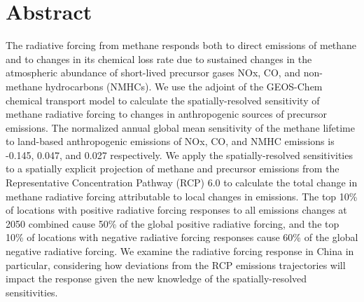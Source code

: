 \section*{Abstract}

The radiative forcing from methane responds both to direct emissions of methane and to changes in its chemical loss rate due to sustained changes in the atmospheric abundance of short-lived precursor gases NOx, CO, and non-methane hydrocarbons (NMHCs). We use the adjoint of the GEOS-Chem chemical transport model to calculate the spatially-resolved sensitivity of methane radiative forcing to changes in anthropogenic sources of precursor emissions. The normalized annual global mean sensitivity of the methane lifetime to land-based anthropogenic emissions of NOx, CO, and NMHC emissions is -0.145, 0.047, and 0.027 respectively. We apply the spatially-resolved sensitivities to a spatially explicit projection of methane and precursor emissions from the Representative Concentration Pathway (RCP) 6.0 to calculate the total change in methane radiative forcing attributable to local changes in emissions. The top 10\% of locations with positive radiative forcing responses to all emissions changes at 2050 combined cause 50\% of the global positive radiative forcing, and the top 10\% of locations with negative radiative forcing responses cause 60\% of the global negative radiative forcing. We examine the radiative forcing response in China in particular, considering how deviations from the RCP emissions trajectories will impact the response given the new knowledge of the spatially-resolved sensitivities.